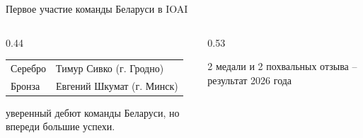 \begin{frame}{Первое участие команды Беларуси в IOAI}
  \vspace{0.2em}
  \begin{columns}[T]
    \begin{column}{0.44\textwidth}
      \textbf{}

      \smallskip
      {\small
      \begin{tabular}{@{}p{}>{\raggedleft\arraybackslash}p{}@{}}
        \toprule
        Серебро             &  Тимур Сивко (г. Гродно) \\
        Бронза              & Евгений Шкумат (г. Минск) \\
        \midrule
        \bottomrule
      \end{tabular}}

      \medskip
      {\footnotesize {}  уверенный дебют команды Беларуси, но впереди большие успехи.}
    \end{column}
    \begin{column}{0.53\textwidth}
      \centering

      \smallskip
      {\scriptsize\color{acGray}2 медали и 2 похвальных отзыва -- результат 2026 года}
    \end{column}
  \end{columns}
\end{frame}
